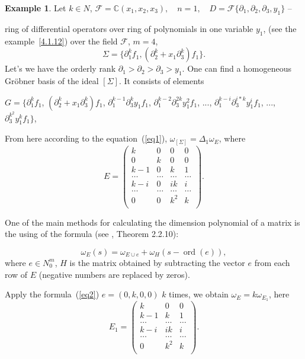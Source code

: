 \documentclass[a4paper,reqno,12pt]{amsart}
\theoremstyle{plain}
\theoremstyle{remark}
\theoremstyle{definition}
\newtheorem{example}{Example}
\DeclareMathOperator {\ord}{ord}
\def\ord{\operatorname{ord}}
\def\C{\mathbb C}
\def\F{\mathcal {F}}
\begin{document}
\begin{example}\label{ex}
Let    $k\in N$,
$
  \F=\C(x_1,x_2,x_3),\quad
  n=1,\quad D=\F\{\partial_1,\partial_2,\partial_3,y_1\}$ -- 

ring of differential operators over
ring of polynomials in one variable $y_1$,
(see the example~\ref {4.1.12}) over the field $\F $,
  $m=4$,
$$
  \Sigma=\{\partial_1^kf_1,(\partial_2^k+x_1\partial_3^k)f_1\}.
$$
Let's we have the orderly rank $\partial_1>\partial_2> \partial_3> y_1 $.
One can find a homogeneous Gr\"obner basis of the ideal $[\Sigma]$. 
It consists of
elements

$G=\{\partial_1^kf_1$, $(\partial_2^k+x_1\partial_3^k)f_1$, 
$\partial_1^{k-1}\partial_3^{k}y_1f_1$,
$\partial_1^{k-2}\partial_3^{2k}y_1^2f_1$, ...,
$\partial_1^{k-i}\partial_3^{i*k}y_1^if_1$, ...,
$\partial_3^{k^2}y_1^kf_1\}$,                                                                                                                               

From here according to the equation~(\ref{eq1}), 
$\omega_{[\Sigma ]}=\Delta_1\omega_E$, where 
$$
E = \left( 
\begin{matrix} 
k & 0 & 0 & 0\\ 
0 & k & 0 & 0\\
k-1&0&k &1\\
\dots&\dots&\dots&\dots\\
k-i&0&ik &i\\
\dots&\dots&\dots&\dots\\
0 & 0 & k^2&k\\
\end{matrix} 
\right).
$$ 

One of the main methods for calculating the dimension polynomial of a matrix
is the using of the formula (see \cite {KLMP}, Theorem 2.2.10):


\begin{equation}\label{eq2}
\omega_E(s)=\omega_{E\cup e}+\omega_H(s-\ord (e)),
\end{equation}
where $e\in N_0^m$, $H$  is the matrix obtained by subtracting the 
vector $e$ from each row of $E$ (negative numbers are replaced by zeros).

Apply the formula~(\ref {eq2}) 
$e =(0, k, 0,0) $ $k$ times, we obtain 
$\omega_E=k\omega_{E_1}$, here 
$$
E_1 = \left( 
\begin{matrix} 
k &  0 & 0\\ 
k-1&k &1\\
\dots&\dots&\dots\\
k-i&ik &i\\
\dots&\dots&\dots\\
0 &  k^2&k\\
\end{matrix} 
\right).
$$ 
 

\end{example}
\end{document}
